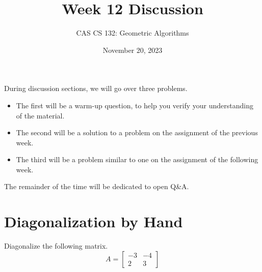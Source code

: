 \documentclass{article}
\title{
  Week 12 Discussion
}
\author{CAS CS 132: Geometric Algorithms}
\date{November 20, 2023}
\theoremstyle{remark}
\begin{document}
\maketitle

\noindent During discussion sections, we will go over three problems.
\begin{itemize}
\item The first will be a warm-up question, to help you verify your understanding of the material.
\item The second will be a solution to a problem on the assignment of the previous week.
\item The third will be a problem similar to one on the assignment of the following week.
\end{itemize}
The remainder of the time will be dedicated to open Q\&A.

\pagebreak
\section{Diagonalization by Hand}

Diagonalize the following matrix.
\begin{displaymath}
  A =
  \begin{bmatrix}
    -3 & -4 \\
    2 & 3
  \end{bmatrix}
\end{displaymath}

\medskip
\end{document}
